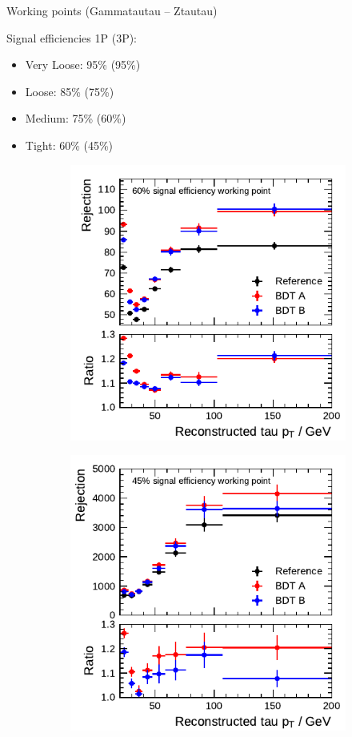 Working points (Gammatautau -- Ztautau)

Signal efficiencies 1P (3P):
\begin{itemize}
\item Very Loose: 95\% (95\%)
\item Loose: 85\% (75\%)
\item Medium: 75\% (60\%)
\item Tight: 60\% (45\%)
\end{itemize}

\begin{figure}[ht]
  \begin{subfigure}[t]{0.48\textwidth}
    \centering
    \includegraphics{./figures/bdt_perf/rejection/post_gridsearch_1p/rejection_tight.pdf}
  \end{subfigure}\hfill
  \begin{subfigure}[t]{0.48\textwidth}
    \centering
    \includegraphics{./figures/bdt_perf/rejection/post_gridsearch_3p/rejection_tight.pdf}

\end{subfigure}
\end{figure}
